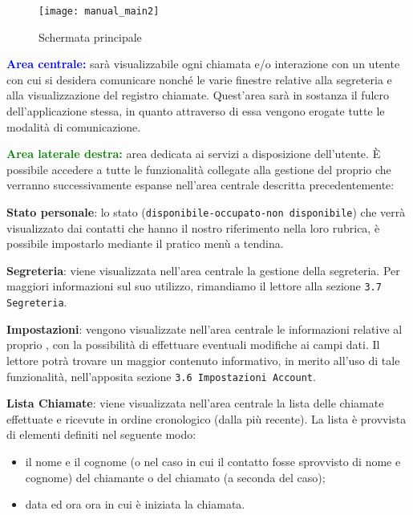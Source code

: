 \begin{figure}[H]
  \texttt{[image: manual\_main2]}
\caption{Schermata principale}\label{fig:main}
\end{figure}


\begin{description}
\item \textcolor{blue}{\textbf{Area centrale:}} sarà visualizzabile ogni chiamata e/o interazione con un utente con cui si desidera comunicare nonché le varie finestre relative alla segreteria e alla visualizzazione del registro chiamate. Quest'area sarà in sostanza il fulcro dell'applicazione stessa, in quanto attraverso di essa vengono erogate tutte le modalità di comunicazione.

\item \textcolor{green}{\textbf{Area laterale destra:}} area dedicata ai servizi a disposizione dell'utente. È possibile accedere a tutte le funzionalità collegate alla gestione del proprio  che verranno successivamente espanse nell'area centrale descritta precedentemente:
\begin{description}
\item \textbf{Stato personale}: lo stato (\texttt{disponibile-occupato-non disponibile}) che verrà visualizzato dai contatti che hanno il nostro riferimento nella loro rubrica, è possibile impostarlo mediante il pratico menù a tendina.
\item \textbf{Segreteria}: viene visualizzata nell'area centrale la gestione della segreteria. Per maggiori informazioni sul suo utilizzo, rimandiamo il lettore alla sezione \texttt{3.7 Segreteria}.
\item \textbf{Impostazioni}: vengono visualizzate nell'area centrale le informazioni relative al 
proprio , con la possibilità di effettuare eventuali modifiche ai campi dati. Il lettore potrà trovare un maggior contenuto informativo, in merito all'uso di tale funzionalità, nell'apposita sezione \texttt{3.6 Impostazioni Account}.
\item \textbf{Lista Chiamate}: viene visualizzata nell'area centrale la lista delle chiamate effettuate e ricevute in ordine cronologico (dalla più recente). La lista è provvista di elementi definiti nel seguente modo:
	\begin{itemize}
		\item il nome e il cognome (o  nel caso in cui il contatto fosse sprovvisto di nome e cognome) del chiamante o del chiamato (a seconda del caso);
		\item data ed ora ora in cui è iniziata la chiamata.

\end{itemize}
\end{description}
\end{description}
